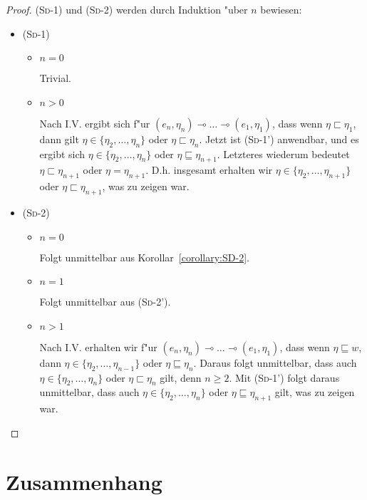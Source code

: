 \documentclass[12pt,fleqn,a4paper]{article}
\newcommand{\RN}[1]{\mbox{\textsc{(#1)}}}
\begin{document}
\begin{proof}
  \RN{Sd-1} und \RN{Sd-2} werden durch Induktion "uber $n$ bewiesen:
  \begin{itemize}
  \item \RN{Sd-1}
    \begin{itemize}
    \item $n = 0$

      Trivial.

    \item $n > 0$

      Nach I.V. ergibt sich f"ur $(e_n,\eta_n) \multimap \ldots \multimap (e_1,\eta_1)$, dass wenn
      $\eta \sqsubset \eta_1$, dann gilt $\eta \in \{\eta_2,\ldots,\eta_n\}$ oder $\eta \sqsubset \eta_n$.
      Jetzt ist \RN{Sd-1'} anwendbar, und es ergibt sich $\eta \in \{\eta_2,\ldots,\eta_n\}$ oder
      $\eta \sqsubseteq \eta_{n+1}$. Letzteres wiederum bedeutet $\eta \sqsubset \eta_{n+1}$ oder
      $\eta = \eta_{n+1}$. D.h. insgesamt erhalten wir $\eta \in \{\eta_2,\ldots,\eta_{n+1}\}$ oder
      $\eta \sqsubset \eta_{n+1}$, was zu zeigen war.
    \end{itemize}

  \item \RN{Sd-2}
    \begin{itemize}
    \item $n = 0$ 

      Folgt unmittelbar aus Korollar~\ref{corollary:SD-2}.

    \item $n = 1$

      Folgt unmittelbar aus \RN{Sd-2'}.

    \item $n > 1$

      Nach I.V. erhalten wir f"ur $(e_n,\eta_n) \multimap \ldots \multimap (e_1,\eta_1)$, dass wenn
      $\eta \sqsubseteq w$, dann $\eta \in \{\eta_2,\ldots,\eta_{n-1}\}$ oder $\eta \sqsubseteq \eta_n$.
      Daraus folgt unmittelbar, dass auch $\eta \in \{\eta_2,\ldots,\eta_n\}$ oder $\eta \sqsubset \eta_n$
      gilt, denn $n \ge 2$. Mit \RN{Sd-1'} folgt daraus unmittelbar, dass auch $\eta \in \{\eta_2,\ldots,\eta_n\}$
      oder $\eta \sqsubseteq \eta_{n+1}$ gilt, was zu zeigen war.
    \end{itemize}
  \end{itemize}
\end{proof}

\section{Zusammenhang}
\end{document}
